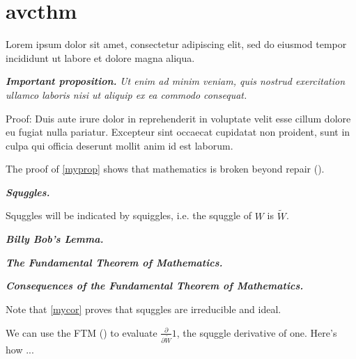 \newpage
\section*{avcthm}\indent

Lorem ipsum dolor sit amet, consectetur adipiscing elit, sed do eiusmod tempor incididunt ut labore et dolore magna aliqua.
\begin{pro}
\label{myprop}
{\bfseries\itshape{}Important proposition.} %
\textit{Ut enim ad minim veniam, quis nostrud exercitation ullamco laboris nisi ut aliquip ex ea commodo consequat.}
\begin{addmargin}[1em]{0em}
Proof:
Duis aute irure dolor in reprehenderit in voluptate velit esse cillum dolore eu fugiat nulla pariatur. Excepteur sint occaecat cupidatat non proident, sunt in culpa qui officia deserunt mollit anim id est laborum.
\end{addmargin}
\end{pro}
The proof of \cref{myprop} shows that mathematics is broken beyond repair ().

\begin{dfn}
{\bfseries\itshape{}Squggles.} %
\end{dfn}

\begin{ntt}
Squggles will be indicated by squiggles, i.e. the squggle of $W$ is $\widetilde{W}$.
\end{ntt}

\begin{lem}
{\bfseries\itshape{}Billy Bob's Lemma.} %
\end{lem}

\begin{thm}
\label{mythm}
{\bfseries\itshape{}The Fundamental Theorem of Mathematics.} %
\end{thm}

\begin{cor}
\label{mycor}
{\bfseries\itshape{}Consequences of the Fundamental Theorem of Mathematics.} %
\end{cor}

\begin{rmk}
Note that \cref{mycor} proves that squggles are irreducible and ideal.
\end{rmk}

\begin{ex}
We can use the FTM () to evaluate $\displaystyle\frac{\partial}{\partial \widetilde{W}}1$, the squggle derivative of one.  Here's how ...
\end{ex}

